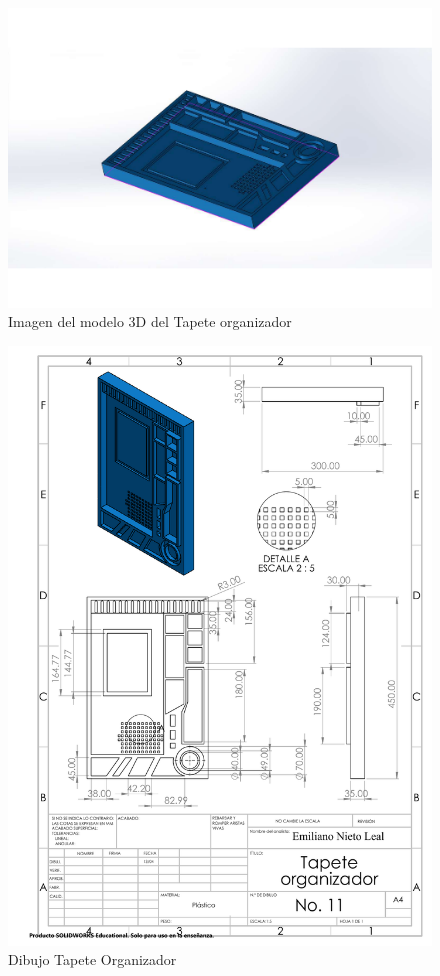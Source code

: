         \begin{figure}[H]
        \centering
        \includegraphics[trim = {65mm 55mm 65mm 55mm},clip,scale=0.5]{19/Img/tapeteOrganizadorFigura.pdf}
        \caption{Imagen del modelo 3D del Tapete organizador}
        \label{fig:tapete}
    \end{figure}
    
    \newpage
                \begin{figure}[H]
        \centering
        \includegraphics[trim = {1mm 1mm 1mm 1mm},clip,scale=0.5]{19/Img/tapeteOrganizadorDibujo.pdf}
        \caption{Dibujo Tapete Organizador}
        \label{fig:tapeteOrganizador}
    \end{figure}
    
